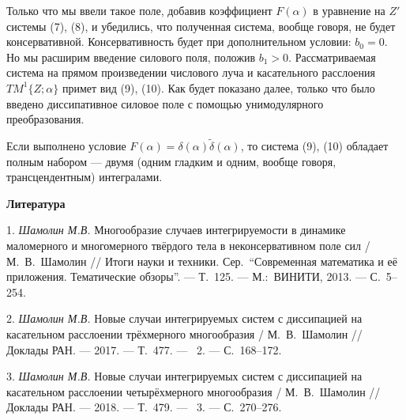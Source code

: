 Только что мы ввели такое поле, добавив коэффициент $F(\alpha)$ в
уравнение на $Z'$ системы (7), (8), и убедились, что полученная
система, вообще говоря, не будет консервативной. Консервативность
будет при дополнительном условии: $b_0=0$. Но мы расширим введение
силового поля, положив $b_1>0$. Рассматриваемая система на прямом
произведении числового луча и касательного расслоения
$TM^1\{Z;\alpha\}$ примет вид (9), (10). Как будет показано далее,
только что было введено диссипативное силовое поле с помощью
унимодулярного преобразования.

Если выполнено условие
$F(\alpha)=\delta(\alpha)\tilde{\delta}(\alpha)$, то система (9),
(10) обладает полным набором
--- двумя (одним гладким и одним, вообще говоря, трансцендентным)
интегралами.



\smallskip \centerline {\bf Литература} \nopagebreak

1. {\it Шамолин М.В.} Многообразие случаев интегрируемости в динамике
маломерного и многомерного твёрдого тела в неконсервативном поле сил
/ М.~В.~Шамолин // Итоги науки и техники. Сер.~``Современная
математика и её приложения. Тематические обзоры''. --- Т.~125. ---
М.:~ВИНИТИ, 2013. --- С.~5--254.

2. {\it Шамолин М.В.} Новые случаи интегрируемых систем с диссипацией на
касательном расслоении трёхмерного многообразия / М.~В.~Шамолин //
Доклады РАН. --- 2017. --- Т.~477. --- \No~2. --- С.~168--172.

3. {\it Шамолин М.В.} Новые случаи интегрируемых систем с диссипацией на
касательном расслоении четырёхмерного многообразия / М.~В.~Шамолин
// Доклады РАН. --- 2018. --- Т.~479. --- \No~3. --- С.~270--276.




